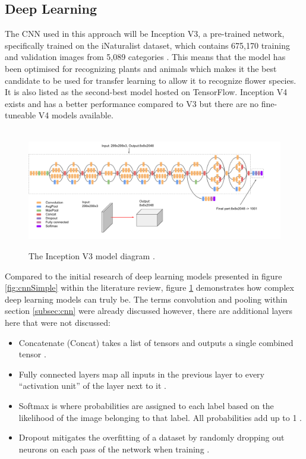 \documentclass[12pt,a4paper]{report}
\begin{document}
\subsection{Deep Learning}

The CNN used in this approach will be Inception V3, a pre-trained network, specifically trained on the iNaturalist 
dataset, which contains 675,170 training and validation images from 5,089 categories \citep{paperswithcode}. 
This means that the model has been optimised for recognizing plants and animals which makes it the best candidate to be 
used for transfer learning to allow it to recognize flower species. It is also listed as the second-best model hosted on
TensorFlow. Inception V4 exists and has a better performance compared to V3 but there are no fine-tuneable V4 models available.   

\begin{figure}[h]\
    \centering
    \includegraphics[width=\textwidth]{inceptionv3.png}
    \caption{The Inception V3 model diagram \citep{GoogleCloud}.}
    \label{fig:inception}
\end{figure}

Compared to the initial research of deep learning models presented in figure \ref{fig:cnnSimple} within the literature 
review, figure \ref{fig:inception} demonstrates how complex deep learning models can truly be. 
The terms convolution and pooling within section \ref{subsec:cnn} were already discussed however, there are additional 
layers here that were not discussed:

\begin{itemize}
    \item Concatenate (Concat) takes a list of tensors and outputs a single combined tensor \citep{kerasconcat}.
    \item Fully connected layers map all inputs in the previous layer to every “activation unit” of the layer next to it
\citep{singhsurya}.
    \item Softmax is where probabilities are assigned to each label based on the likelihood of the image belonging to 
that label. All probabilities add up to 1 \citep{googledevcnn}. 
    \item Dropout mitigates the overfitting of a dataset by randomly dropping out neurons on each pass of the network when 
    training \citep{seb}. 
\end{itemize}
\end{document}
